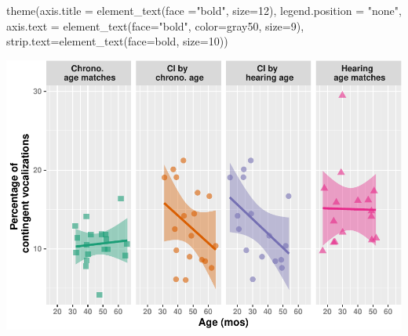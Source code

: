 \documentclass[
]{article}
\newenvironment{Shaded}{\begin{snugshade}}{\end{snugshade}}
\newcommand{\AttributeTok}[1]{\textcolor[rgb]{0.77,0.63,0.00}{#1}}
\newcommand{\DecValTok}[1]{\textcolor[rgb]{0.00,0.00,0.81}{#1}}
\newcommand{\FunctionTok}[1]{\textcolor[rgb]{0.00,0.00,0.00}{#1}}
\newcommand{\NormalTok}[1]{#1}
\newcommand{\StringTok}[1]{\textcolor[rgb]{0.31,0.60,0.02}{#1}}
\begin{document}
\begin{Shaded}
\begin{Highlighting}[]
    \FunctionTok{theme}\NormalTok{(}\AttributeTok{axis.title =} \FunctionTok{element\_text}\NormalTok{(}\AttributeTok{face =}\StringTok{"bold"}\NormalTok{, }\AttributeTok{size=}\DecValTok{12}\NormalTok{),}
        \AttributeTok{legend.position =} \StringTok{"none"}\NormalTok{, }
        \AttributeTok{axis.text =} \FunctionTok{element\_text}\NormalTok{(}\AttributeTok{face=}\StringTok{"bold"}\NormalTok{, }\AttributeTok{color=}\StringTok{\textquotesingle{}gray50\textquotesingle{}}\NormalTok{, }\AttributeTok{size=}\DecValTok{9}\NormalTok{),}
        \AttributeTok{strip.text=}\FunctionTok{element\_text}\NormalTok{(}\AttributeTok{face=}\StringTok{\textquotesingle{}bold\textquotesingle{}}\NormalTok{, }\AttributeTok{size=}\DecValTok{10}\NormalTok{))}
\end{Highlighting}
\end{Shaded}

\includegraphics{everyday_CI_files/figure-latex/visualize perc contingent vocs by age-1.pdf}
\end{document}
